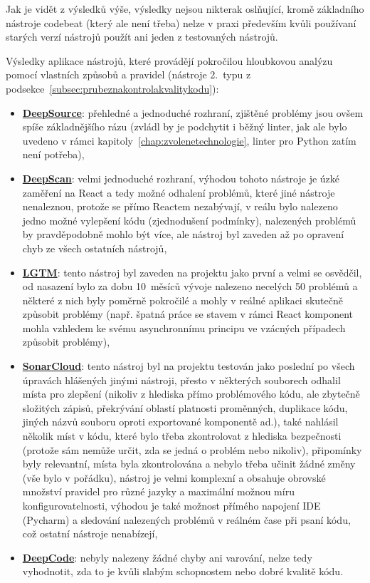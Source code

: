 Jak je vidět z výsledků výše, výsledky nejsou nikterak oslňující, kromě základního nástroje codebeat (který ale není třeba) nelze v praxi především kvůli používaní starých verzí nástrojů použít ani jeden z testovaných nástrojů.

Výsledky aplikace nástrojů, které provádějí pokročilou hloubkovou analýzu pomocí vlastních způsobů a pravidel (nástroje 2.~typu z podsekce~\ref{subsec:prubeznakontrolakvalitykodu}):
\begin{itemize}
    \item \href{https://deepsource.io/}{\textbf{DeepSource}}: přehledné a jednoduché rozhraní, zjištěné problémy jsou ovšem spíše základnějšího rázu (zvládl by je podchytit i běžný linter, jak ale bylo uvedeno v rámci kapitoly~\ref{chap:zvolenetechnologie}, linter pro Python zatím není potřeba),
    \item \href{https://deepscan.io}{\textbf{DeepScan}}: velmi jednoduché rozhraní, výhodou tohoto nástroje je úzké zaměření na React a tedy možné odhalení problémů, které jiné nástroje nenaleznou, protože se přímo Reactem nezabývají, v reálu bylo nalezeno jedno možné vylepšení kódu (zjednodušení podmínky), nalezených problémů by pravděpodobně mohlo být více, ale nástroj byl zaveden až po opravení chyb ze všech ostatních nástrojů,
    \item \href{https://lgtm.com}{\textbf{LGTM}}: tento nástroj byl zaveden na projektu jako první a velmi se osvědčil, od nasazení bylo za dobu 10~měsíců vývoje nalezeno necelých 50 problémů a některé z nich byly poměrně pokročilé a mohly v reálné aplikaci skutečně způsobit problémy (např. špatná práce se stavem v rámci React komponent mohla vzhledem ke svému asynchronnímu principu ve vzácných případech způsobit problémy),
    \item \href{https://sonarcloud.io/}{\textbf{SonarCloud}}: tento nástroj byl na projektu testován jako poslední po všech úpravách hlášených jinými nástroji, přesto v některých souborech odhalil místa pro zlepšení (nikoliv z hlediska přímo problémového kódu, ale zbytečně složitých zápisů, překrývání oblastí platnosti proměnných, duplikace kódu, jiných názvů souboru oproti exportované komponentě ad.), také nahlásil několik míst v kódu, které bylo třeba zkontrolovat z hlediska bezpečnosti (protože sám nemůže určit, zda se jedná o problém nebo nikoliv), připomínky byly relevantní, místa byla zkontrolována a nebylo třeba učinit žádné změny (vše bylo v pořádku), nástroj je velmi komplexní a obsahuje obrovské množství pravidel pro různé jazyky a maximální možnou míru konfigurovatelnosti, výhodou je také možnost přímého napojení IDE (Pycharm) a sledování nalezených problémů v reálném čase při psaní kódu, což ostatní nástroje nenabízejí,
    \item \href{https://www.deepcode.ai/}{\textbf{DeepCode}}: nebyly nalezeny žádné chyby ani varování, nelze tedy vyhodnotit, zda to je kvůli slabým schopnostem nebo dobré kvalitě kódu.
\end{itemize}

